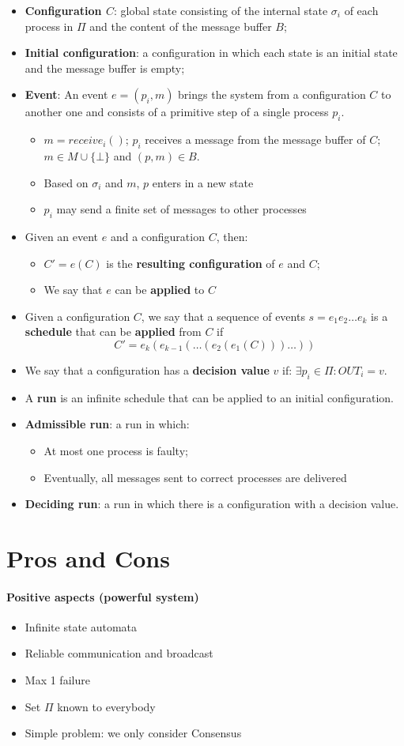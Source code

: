 \documentclass[12pt]{article}
\newcommand{\BI}{\begin{itemize}}
\newcommand{\EI}{\end{itemize}}
\newcommand{\OUT}{\mathit{OUT}}
\newcommand{\receive}{\mathit{receive}}
\begin{document}
\BI
\item {\bf Configuration $C$}: global state consisting of the internal state $\sigma_i$ of each 
  process in $\Pi$ and the content of the message buffer $B$;
\item {\bf Initial configuration}: a configuration in which each state is
  an initial state and the message buffer is empty;
\item {\bf Event}:
  An event $e = (p_i, m)$ brings the system from a configuration $C$ to another one 
  and consists of a primitive step of a single process $p_i$.
  \BI
  \item $m = \receive_i()$; $p_i$ receives a message from the message buffer of $C$; \\
    $m \in M \cup \{ \bot \}$ and $(p,m) \in B$.
  \item Based on $\sigma_i$ and $m$, $p$ enters in a new state
  \item $p_i$ may send a finite set of messages to other processes
  \EI
\item Given an event $e$ and a configuration $C$, then:
  \BI
  \item $C' = e(C)$ is the {\bf resulting configuration} of $e$ and $C$;
  \item We say that $e$ can be {\bf applied} to $C$
  \EI
\item Given a configuration $C$, we say that a sequence of events $s=e_1 e_2 \ldots e_k$ is 
  a {\bf schedule} that can be {\bf applied} from $C$ if 
  \[
    C' = e_k(e_{k-1}(\ldots(e_2(e_1(C)))\ldots))
  \]
\item We say that a configuration has a {\bf decision value} $v$ if:
  $\exists p_i \in \Pi: \OUT_i = v$.
\item A {\bf run} is an infinite schedule that can be applied to an initial configuration.
\item {\bf Admissible run}: a run in which:
  \BI
  \item At most one process is faulty;
  \item Eventually, all messages sent to correct processes are delivered
  \EI
\item {\bf Deciding run}: a run in which there is a configuration with 
  a decision value.
\EI

\section*{Pros and Cons}

\paragraph{Positive aspects (powerful system)}
\BI
\item Infinite state automata
\item Reliable communication and broadcast
\item Max 1 failure
\item Set $\Pi$ known to everybody
\item Simple problem: we only consider Consensus
\EI
\end{document}
